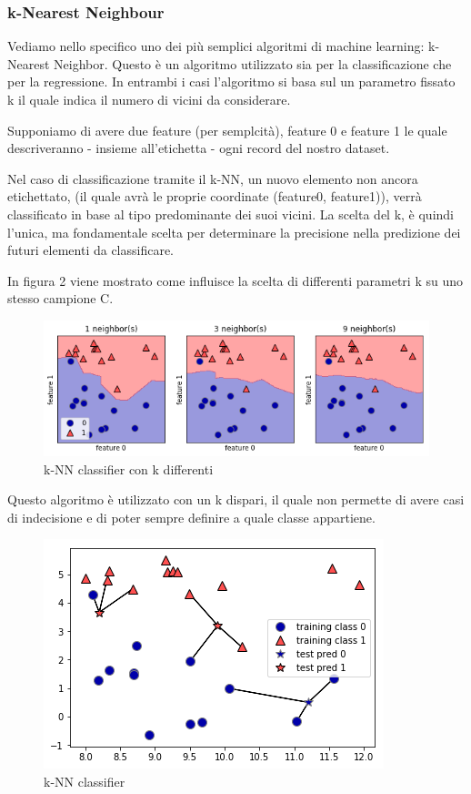 \documentclass[12pt,italian]{report}
\begin{document}
\pagebreak

\subsubsection{k-Nearest Neighbour}

Vediamo nello specifico uno dei più semplici algoritmi di machine learning: k-Nearest Neighbor. Questo è un algoritmo utilizzato sia per la classificazione che per la regressione. In entrambi i casi l'algoritmo si basa sul un parametro fissato k il quale indica il numero di vicini da considerare.

Supponiamo di avere due feature (per semplcità), feature 0 e feature 1 le quale descriveranno - insieme all'etichetta - ogni record del nostro dataset. 

Nel caso di classificazione tramite il k-NN, un nuovo elemento non ancora etichettato, (il quale avrà le proprie coordinate (feature0, feature1)), verrà classificato in base al tipo predominante dei suoi vicini. La scelta del k, è quindi l'unica, ma fondamentale scelta per determinare la precisione nella predizione dei futuri elementi da classificare.

In figura 2 viene mostrato come influisce la scelta di differenti parametri k su uno stesso campione C.
\vspace{5 mm}
\begin{figure}[h!]
	\center
	\label{fig:knn_difference}
	\includegraphics[scale=0.7]{../img/knn_comparison}
	\caption{k-NN classifier con k differenti}
\end{figure}

Questo algoritmo è utilizzato con un k dispari, il quale non permette di avere casi di indecisione e di poter sempre definire a quale classe appartiene.
\pagebreak
\vspace{5 mm}
\begin{figure}[h!]
	\center
	\label{fig:knn_classifier}
	\includegraphics[scale=0.85]{../img/knn_classifier}
	\caption{k-NN classifier}
\end{figure}
\end{document}
